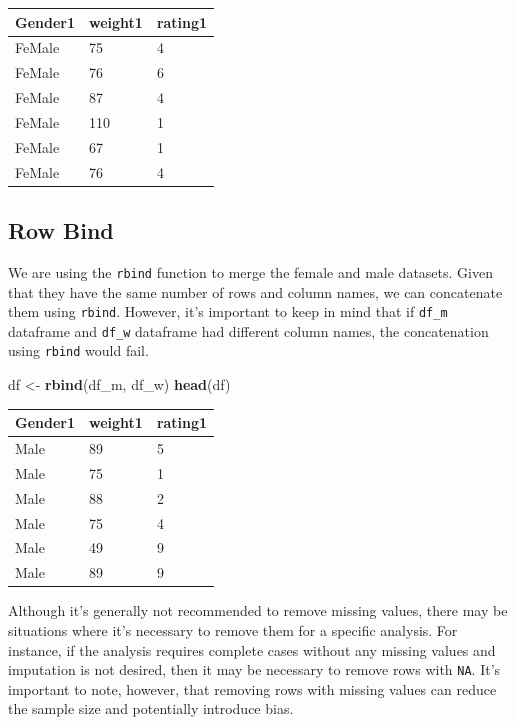 \documentclass[
]{article}
\newenvironment{Shaded}{\begin{snugshade}}{\end{snugshade}}
\newcommand{\FunctionTok}[1]{\textcolor[rgb]{0.13,0.29,0.53}{\textbf{#1}}}
\newcommand{\NormalTok}[1]{#1}
\newcommand{\OtherTok}[1]{\textcolor[rgb]{0.56,0.35,0.01}{#1}}
\begin{document}
\begin{longtable}[]{@{}lll@{}}
\toprule\noalign{}
Gender1 & weight1 & rating1 \\
\midrule\noalign{}
\endhead
\bottomrule\noalign{}
\endlastfoot
FeMale & 75 & 4 \\
FeMale & 76 & 6 \\
FeMale & 87 & 4 \\
FeMale & 110 & 1 \\
FeMale & 67 & 1 \\
FeMale & 76 & 4 \\
\end{longtable}

\hypertarget{row-bind}{%
\subsection{Row Bind}\label{row-bind}}

We are using the \texttt{rbind} function to merge the female and male
datasets. Given that they have the same number of rows and column names,
we can concatenate them using \texttt{rbind}. However, it's important to
keep in mind that if \texttt{df\_m} dataframe and \texttt{df\_w}
dataframe had different column names, the concatenation using
\texttt{rbind} would fail.

\begin{Shaded}
\begin{Highlighting}[]
\NormalTok{df }\OtherTok{\textless{}{-}} \FunctionTok{rbind}\NormalTok{(df\_m, df\_w)}
\FunctionTok{head}\NormalTok{(df)}
\end{Highlighting}
\end{Shaded}

\begin{longtable}[]{@{}lll@{}}
\toprule\noalign{}
Gender1 & weight1 & rating1 \\
\midrule\noalign{}
\endhead
\bottomrule\noalign{}
\endlastfoot
Male & 89 & 5 \\
Male & 75 & 1 \\
Male & 88 & 2 \\
Male & 75 & 4 \\
Male & 49 & 9 \\
Male & 89 & 9 \\
\end{longtable}

Although it's generally not recommended to remove missing values, there
may be situations where it's necessary to remove them for a specific
analysis. For instance, if the analysis requires complete cases without
any missing values and imputation is not desired, then it may be
necessary to remove rows with \texttt{NA}. It's important to note,
however, that removing rows with missing values can reduce the sample
size and potentially introduce bias.
\end{document}
